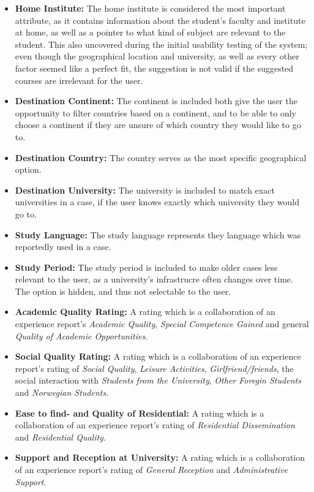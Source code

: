 \begin{itemize}
\item \textbf{Home Institute:} The home institute is considered the most important attribute, as it contains information about the student's faculty and institute at home, as well as a pointer to what kind of subject are relevant to the student. This also uncovered during the initial usability testing of the system; even though the geographical location and university, as well as every other factor seemed like a perfect fit, the suggestion is not valid if the suggested courses are irrelevant for the user. 

\item \textbf{Destination Continent:} The continent is included both give the user the opportunity to filter countries based on a continent, and to be able to only choose a continent if they are unsure of which country they would like to go to. 

\item \textbf{Destination Country:} The country serves as the most specific geographical option.

\item \textbf{Destination University:} The university is included to match exact universities in a case, if the user knows exactly which university they would go to.

\item \textbf{Study Language:} The study language represents they language which was reportedly used in a case.

\item \textbf{Study Period:} The study period is included to make older cases less relevant to the user, as a university's infrastrucre often changes over time. The option is hidden, and thus not selectable to the user. 

\item \textbf{Academic Quality Rating:} A rating which is a collaboration of an experience report's \emph{Academic Quality}, \emph{Special Competence Gained} and general \emph{Quality of Academic Opportunities}.

\item \textbf{Social Quality Rating:} A rating which is a collaboration of an experience report's rating of  \emph{Social Quality}, \emph{Leisure Activities}, \emph{Girlfriend/friends}, the social interaction with \emph{Students from the University}, \emph{Other Foregin Students} and \emph{Norwegian Students}.

\item \textbf{Ease to find- and Quality of Residential:} A rating which is a collaboration of an experience report's rating of \emph{Residential Dissemination} and \emph{Residential Quality}.

\item \textbf{Support and Reception at University:} A rating which is a collaboration of an experience report's rating of \emph{General Reception} and \emph{Administrative Support}.
\end{itemize}

